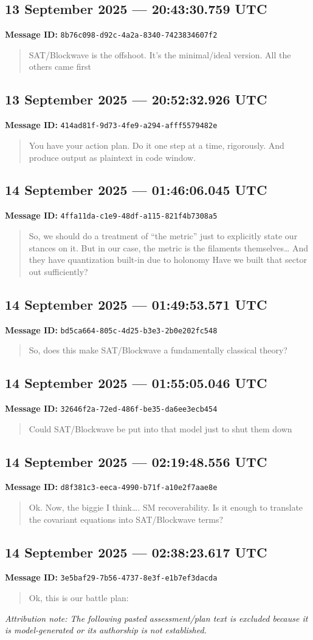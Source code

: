 \documentclass[11pt,letterpaper]{article}
\newcommand{\messageentry}[3]{%
  \Needspace{7\baselineskip}
  \subsection*{#1}
  {\small\textbf{Message ID:} \texttt{#2}}
  \vspace{2pt}
}
\begin{document}
\messageentry{13 September 2025 --- 20:43:30.759 UTC}{8b76c098-d92c-4a2a-8340-7423834607f2}{}
\begin{quote}\small
SAT/Blockwave is the offshoot. It’s the minimal/ideal version. All the others came first 
\end{quote}

\messageentry{13 September 2025 --- 20:52:32.926 UTC}{414ad81f-9d73-4fe9-a294-afff5579482e}{}
\begin{quote}\small
You have your action plan. Do it one step at a time, rigorously. And produce output as plaintext in code window. 
\end{quote}

\messageentry{14 September 2025 --- 01:46:06.045 UTC}{4ffa11da-c1e9-48df-a115-821f4b7308a5}{}
\begin{quote}\small
So, we should do a treatment of “the metric” just to explicitly state our stances on it. But in our case, the metric is the filaments themselves… And they have quantization built-in due to holonomy Have we built that sector out sufficiently?
\end{quote}

\messageentry{14 September 2025 --- 01:49:53.571 UTC}{bd5ca664-805c-4d25-b3e3-2b0e202fc548}{}
\begin{quote}\small
So, does this make SAT/Blockwave a fundamentally classical theory?
\end{quote}

\messageentry{14 September 2025 --- 01:55:05.046 UTC}{32646f2a-72ed-486f-be35-da6ee3ecb454}{}
\begin{quote}\small
Could SAT/Blockwave be put into that model just to shut them down 
\end{quote}

\messageentry{14 September 2025 --- 02:19:48.556 UTC}{d8f381c3-eeca-4990-b71f-a10e2f7aae8e}{}
\begin{quote}\small
Ok. Now, the biggie I think…. SM recoverability. Is it enough to translate the covariant equations into SAT/Blockwave terms?
\end{quote}

\messageentry{14 September 2025 --- 02:38:23.617 UTC}{3e5baf29-7b56-4737-8e3f-e1b7ef3dacda}{}
\begin{quote}\small
Ok, this is our battle plan:
\end{quote}
{\small\emph{Attribution note: The following pasted assessment/plan text is excluded because it is model-generated or its authorship is not established.}}
\end{document}
